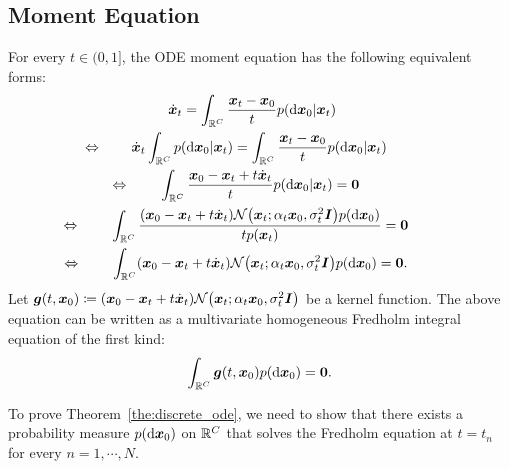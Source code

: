 \subsection{Moment Equation}
For every $t\in(0, 1]$, the ODE moment equation has the following equivalent forms:
\begin{gather}
\begin{aligned}
    \dot{\vx}_t &= \int_{\R^C} \frac{\vx_t - \vx_0}{t} p(\diff \vx_0 | \vx_t) \notag
\end{aligned} \\
\begin{aligned}
    \equivto \dot{\vx}_t \int_{\R^C} p(\diff \vx_0 | \vx_t) = \int_{\R^C} \frac{\vx_t - \vx_0}{t} p(\diff \vx_0 | \vx_t) \notag
\end{aligned} \\
\begin{aligned}
    \equivto \int_{\R^C} \frac{\vx_0 - \vx_t + t\dot{\vx}_t}{t} p(\diff \vx_0 | \vx_t) = \bm{0} \notag
\end{aligned} \\
\begin{aligned}
    \equivto \int_{\R^C} \frac{(\vx_0 - \vx_t + t\dot{\vx}_t) \mathcal{N}\left(\vx_t; \alpha_t \vx_0, \sigma_t^2 \mI\right) p(\diff \vx_0)}{t p(\vx_t)} = \bm{0} \notag
\end{aligned} \\
\begin{aligned}
    \equivto \int_{\R^C} (\vx_0 - \vx_t + t\dot{\vx}_t) \mathcal{N}\left(\vx_t; \alpha_t \vx_0, \sigma_t^2 \mI\right) p(\diff \vx_0) = \bm{0}.
    \label{eq:fredholm_multi}
\end{aligned}
\end{gather}
Let $\vg(t,\vx_0) \coloneqq (\vx_0 - \vx_t + t\dot{\vx}_t) \mathcal{N}\left(\vx_t; \alpha_t \vx_0, \sigma_t^2 \mI\right)$ be a kernel function. The above equation can be written as a multivariate homogeneous Fredholm integral equation of the first kind:
\begin{align}
    \int_{\mathbb{R}^C} {\bm{g}}(t,{\bm{x}}_0) p(\mathop{}\!\mathrm{d} {\bm{x}}_0) = \bm{0}.
    \label{eq:fredholm}
\end{align}

To prove Theorem~\ref{the:discrete_ode}, we need to show that there exists a probability measure $p(\mathop{}\!\mathrm{d} {\bm{x}}_0)$ on $\mathbb{R}^C$ that solves the Fredholm equation at $t=t_n$ for every $n=1,\cdots,N$.

